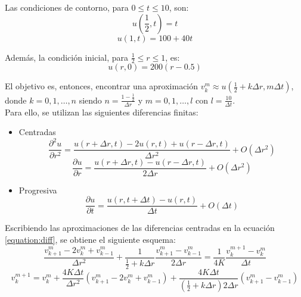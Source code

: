 \documentclass[journal, monochrome]{IEEEtran}
\begin{document}
Las condiciones de contorno, para $0 \leq t \leq 10$, son: \\
\begin{equation}
u(\frac{1}{2}, t) = t
\label{equation:contour1}
\end{equation}
\begin{equation}
u(1, t) = 100 + 40t
\label{equation:contour2}
\end{equation}


Además, la condición inicial, para $\frac{1}{2} \leq r \leq 1$, es:
\begin{equation}
u(r, 0) = 200(r-0.5)
\label{equation:initial}
\end{equation}


El objetivo es, entonces, encontrar una aproximación $v_{k}^{m} \approx u(\frac{1}{2} + k\Delta r, m\Delta t)$, donde $k = 0,1,\dots,n$ 
siendo $n = \frac{1-\frac{1}{2}}{\Delta r}$ y $m = 0,1,\dots,l$ con $l = \frac{10}{\Delta t}$. \\

Para ello, se utilizan las siguientes diferencias finitas:
\begin{itemize}
\item Centradas \\
\begin{equation}
\frac{\partial^{2} u}{\partial r^{2}} = \frac{u(r+\Delta r, t) - 2 u(r,t) + u(r-\Delta r,t)}{\Delta r^{2}} + O(\Delta r^{2})
\end{equation}
\begin{equation}
\frac{\partial u}{\partial r} = \frac{u(r+\Delta r, t) - u(r-\Delta r,t)}{2\Delta r} + O(\Delta r^{2})
\end{equation}
\item Progresiva \\
\begin{equation}
\frac{\partial u}{\partial t} = \frac{u(r, t + \Delta t) - u(r,t)}{\Delta t} + O(\Delta t)
\end{equation}
\end{itemize}

Escribiendo las aproximaciones de las diferencias centradas en la ecuación \eqref{equation:diff}, se obtiene el siguiente esquema: \\
\begin{equation}
\frac{v_{k+1}^{m} - 2v_{k}^{m} + v_{k-1}^{m}}{\Delta r^{2}} + \frac{1}{\frac{1}{2}+k\Delta r} \frac{v_{k+1}^{m}-v_{k-1}^{m}}{2\Delta r} = \frac{1}{4K} \frac{v_{k}^{m+1} - v_{k}^{m}}{\Delta t}
\end{equation}
\begin{equation}
v_{k}^{m+1} = v_{k}^{m} + \frac{4K\Delta t}{\Delta r^{2}} (v_{k+1}^{m} - 2v_{k}^{m} + v_{k-1}^{m}) + \frac{4K\Delta t}{(\frac{1}{2}+k\Delta r)2\Delta r} (v_{k+1}^{m}-v_{k-1}^{m})
\label{equation:diffapprox}
\end{equation}
\end{document}
